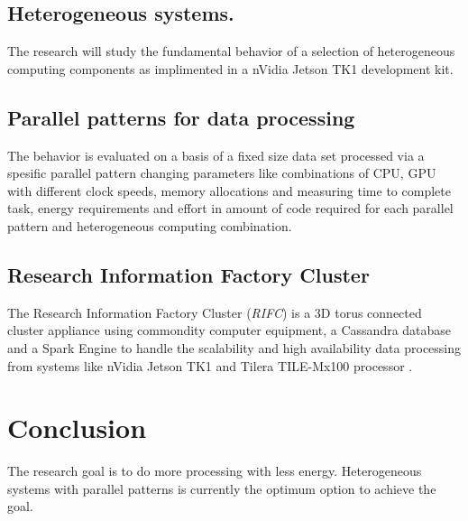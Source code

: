 \documentclass{acm_proc_article-sp}
\begin{document}
\subsection{Heterogeneous systems.}
The research will study the fundamental behavior of a selection of heterogeneous computing components as implimented in a nVidia Jetson TK1 development kit. \cite{jetsonwebsite}
\subsection{Parallel patterns for data processing}
The behavior is evaluated on a basis of a fixed size data set processed via a spesific parallel pattern changing parameters like combinations of CPU, GPU with different clock speeds, memory allocations and measuring time to complete task, energy requirements and effort in amount of code required for each parallel pattern and heterogeneous computing combination. 
\subsection{Research Information Factory Cluster}
The Research Information Factory Cluster (\textit{RIFC}) is a 3D torus connected cluster appliance using commondity computer equipment, a Cassandra database \cite{cassandrawebsite,datastaxwebsite} and a Spark Engine \cite{datastaxwebsite,incubatorspark} to handle the scalability and high availability data processing from systems like nVidia Jetson TK1 \cite{jetsonwebsite} and Tilera TILE-Mx100 processor \cite{mattson2008programming}.
\section{Conclusion}
The research goal is to do more processing with less energy. Heterogeneous systems with parallel patterns is currently the optimum option to achieve the goal. 

{\small }
\end{document}
